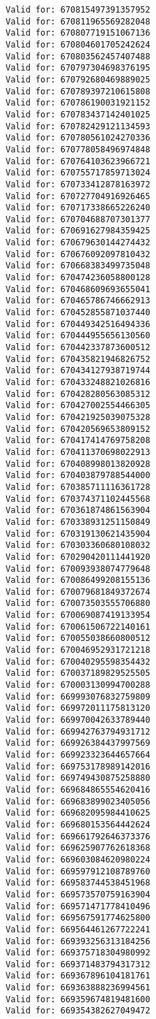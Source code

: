 \documentclass[11pt]{article}
\begin{document}
\begin{Verbatim}[commandchars=\\\{\}]
Valid for: 670815497391357952
Valid for: 670811965569282048
Valid for: 670807719151067136
Valid for: 670804601705242624
Valid for: 670803562457407488
Valid for: 670797304698376195
Valid for: 670792680469889025
Valid for: 670789397210615808
Valid for: 670786190031921152
Valid for: 670783437142401025
Valid for: 670782429121134593
Valid for: 670780561024270336
Valid for: 670778058496974848
Valid for: 670764103623966721
Valid for: 670755717859713024
Valid for: 670733412878163972
Valid for: 670727704916926465
Valid for: 670717338665226240
Valid for: 670704688707301377
Valid for: 670691627984359425
Valid for: 670679630144274432
Valid for: 670676092097810432
Valid for: 670668383499735048
Valid for: 670474236058800128
Valid for: 670468609693655041
Valid for: 670465786746662913
Valid for: 670452855871037440
Valid for: 670449342516494336
Valid for: 670444955656130560
Valid for: 670442337873600512
Valid for: 670435821946826752
Valid for: 670434127938719744
Valid for: 670433248821026816
Valid for: 670428280563085312
Valid for: 670427002554466305
Valid for: 670421925039075328
Valid for: 670420569653809152
Valid for: 670417414769758208
Valid for: 670411370698022913
Valid for: 670408998013820928
Valid for: 670403879788544000
Valid for: 670385711116361728
Valid for: 670374371102445568
Valid for: 670361874861563904
Valid for: 670338931251150849
Valid for: 670319130621435904
Valid for: 670303360680108032
Valid for: 670290420111441920
Valid for: 670093938074779648
Valid for: 670086499208155136
Valid for: 670079681849372674
Valid for: 670073503555706880
Valid for: 670069087419133954
Valid for: 670061506722140161
Valid for: 670055038660800512
Valid for: 670046952931721218
Valid for: 670040295598354432
Valid for: 670037189829525505
Valid for: 670003130994700288
Valid for: 669993076832759809
Valid for: 669972011175813120
Valid for: 669970042633789440
Valid for: 669942763794931712
Valid for: 669926384437997569
Valid for: 669923323644657664
Valid for: 669753178989142016
Valid for: 669749430875258880
Valid for: 669684865554620416
Valid for: 669683899023405056
Valid for: 669682095984410625
Valid for: 669680153564442624
Valid for: 669661792646373376
Valid for: 669625907762618368
Valid for: 669603084620980224
Valid for: 669597912108789760
Valid for: 669583744538451968
Valid for: 669573570759163904
Valid for: 669571471778410496
Valid for: 669567591774625800
Valid for: 669564461267722241
Valid for: 669393256313184256
Valid for: 669375718304980992
Valid for: 669371483794317312
Valid for: 669367896104181761
Valid for: 669363888236994561
Valid for: 669359674819481600
Valid for: 669354382627049472

\end{Verbatim}
\end{document}
